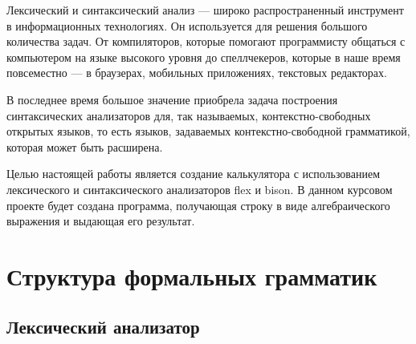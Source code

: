 \documentclass[bachelor, och, coursework, times]{SCWorks}
\begin{document}


\tableofcontents





\intro
Лексический и синтаксический анализ --- широко распространенный инструмент в информационных технологиях. Он используется для решения большого количества задач. От компиляторов, которые помогают программисту общаться с компьютером на языке высокого уровня до спеллчекеров, которые в наше время повсеместно --- в браузерах, мобильных приложениях, текстовых редакторах.

В последнее время большое значение приобрела задача построения синтаксических анализаторов для, так называемых, контекстно-свободных открытых языков, то есть языков, задаваемых контекстно-свободной грамматикой, которая может быть расширена.

Целью настоящей работы является создание калькулятора с использованием лексического и синтаксического анализаторов flex и bison. В данном курсовом проекте будет создана программа, получающая строку в виде алгебраического выражения и выдающая его результат.

\section{Структура формальных грамматик}
\subsection{Лексический анализатор}
\end{document}
